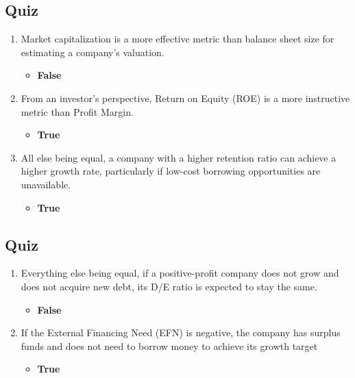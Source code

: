 \begin{tiny}
  \subsection{Quiz}
  \begin{enumerate}[itemsep=-0.5em]
    \item Market capitalization is a more effective metric than balance sheet size for estimating a company's valuation.
          \begin{itemize}[itemsep=-0.2em]
            \item \textbf{False}
          \end{itemize}
    \item From an investor's perspective, Return on Equity (ROE) is a more instructive metric than Profit Margin.
          \begin{itemize}[itemsep=-0.2em]
            \item \textbf{True}
          \end{itemize}
    \item All else being equal, a company with a higher retention ratio can achieve a higher growth rate, particularly if low-cost borrowing opportunities are unavailable.
          \begin{itemize}[itemsep=-0.2em]
            \item \textbf{True}
          \end{itemize}
  \end{enumerate}
  \subsection{Quiz}
  \begin{enumerate}[itemsep=-0.5em]
    \item Everything else being equal, if a positive-profit company does not grow and does not acquire new debt, its D/E ratio is expected to stay the same.
          \begin{itemize}[itemsep=-0.2em]
            \item \textbf{False}
          \end{itemize}
    \item If the External Financing Need (EFN) is negative, the company has surplus funds and does not need to borrow money to achieve its growth target
          \begin{itemize}[itemsep=-0.2em]
            \item \textbf{True}
          \end{itemize}
  \end{enumerate}

\end{tiny}
